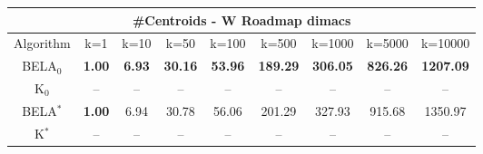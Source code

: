 \begin{tabular}{c|cccccccc}\toprule
\multicolumn{9}{c}{#Centroids - W Roadmap dimacs}\\ \midrule
Algorithm & k=1 & k=10 & k=50 & k=100 & k=500 & k=1000 & k=5000 & k=10000 \\ \midrule
BELA$_0$ & \textbf{1.00} & \textbf{6.93} & \textbf{30.16} & \textbf{53.96} & \textbf{189.29} & \textbf{306.05} & \textbf{826.26} & \textbf{1207.09} \\
K$_0$ & -- & -- & -- & -- & -- & -- & -- & -- \\
BELA$^*$ & \textbf{1.00} & 6.94 & 30.78 & 56.06 & 201.29 & 327.93 & 915.68 & 1350.97 \\
K$^*$ & -- & -- & -- & -- & -- & -- & -- & -- \\ \bottomrule 
\end{tabular}
